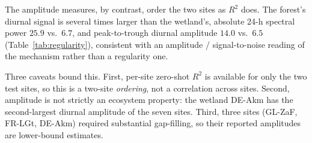 \documentclass[sigconf]{acmart}          %
\begin{document}
The amplitude measures, by contrast, order the two sites as $R^2$ does. The
forest's diurnal signal is several times larger than the wetland's, absolute
24-h spectral power $25.9$ vs.\ $6.7$, and peak-to-trough diurnal amplitude
$14.0$ vs.\ $6.5$ (Table~\ref{tab:regularity}), consistent with an amplitude /
signal-to-noise reading of the mechanism rather than a regularity one.

Three caveats bound this. First, per-site zero-shot $R^2$ is available for only
the two test sites, so this is a two-site \emph{ordering}, not a correlation
across sites. Second, amplitude is not strictly an ecosystem property: the
wetland DE-Akm has the second-largest diurnal amplitude of the seven sites.
Third, three sites (GL-ZaF, FR-LGt, DE-Akm) required substantial gap-filling, so
their reported amplitudes are lower-bound estimates.
\end{document}
